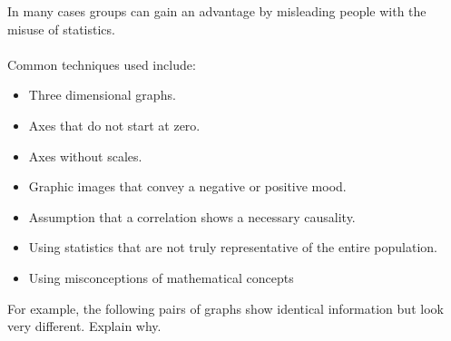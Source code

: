 \documentclass[10pt,a4paper,titlepage,twoside,openright]{report}
\begin{document}
In many cases groups can gain an advantage by misleading people with the misuse of statistics.\\\\
Common techniques used include:
\begin{itemize}
\item Three dimensional graphs.
\item Axes that do not start at zero.
\item Axes without scales.
\item Graphic images that convey a negative or positive mood.
\item Assumption that a correlation shows a necessary causality.
\item Using statistics that are not truly representative of the entire population.
\item Using misconceptions of mathematical concepts
\end{itemize}

For example, the following pairs of graphs show identical information but look very different. Explain why.
\end{document}
